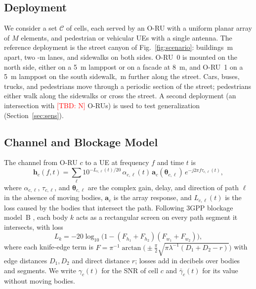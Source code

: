 \documentclass[journal]{IEEEtran}
\newcommand{\tbd}[1]{\textcolor{red}{[TBD: #1]}}
\begin{document}
\subsection{Deployment}
We consider a set $\mathcal C$ of cells, each served by an O-RU with a
uniform planar array of $M$ elements, and pedestrian or vehicular UEs
with a single antenna. The reference deployment is the street canyon of
Fig.~\ref{fig:scenario}: buildings \pStreetWidth\,m apart, two
\pLaneWidth-m lanes, and sidewalks on both sides. O-RU~0 is mounted on
the north side, either on a \SI{5}{m} lamppost or on a facade at
\SI{8}{m}, and O-RU~1 on a \SI{5}{m} lamppost on the south sidewalk,
\pOruOffset\,m further along the street. Cars, buses, trucks, and
pedestrians move through a periodic section of the street; pedestrians
either walk along the sidewalks or cross the street.
\textcolor{propcol}{A second deployment (an intersection with \tbd{N}
O-RUs) is used to test generalization (Section~\ref{sec:sens}).}

\subsection{Channel and Blockage Model}
The channel from O-RU $c$ to a UE at frequency $f$ and time $t$ is
\begin{equation}
\mathbf h_c(f,t)=\sum_{\ell} 10^{-L_{c,\ell}(t)/20}\,\alpha_{c,\ell}(t)\,
\mathbf a_c(\boldsymbol\theta_{c,\ell})\,e^{-j2\pi f\tau_{c,\ell}(t)},
\label{eq:channel}
\end{equation}
where $\alpha_{c,\ell}$, $\tau_{c,\ell}$, and $\boldsymbol\theta_{c,\ell}$
are the complex gain, delay, and direction of path $\ell$ in the absence
of moving bodies, $\mathbf a_c$ is the array response, and
$L_{c,\ell}(t)$ is the loss caused by the bodies that intersect the path.
Following 3GPP blockage model~B \cite{3gpp38901}, each body $k$ acts as a
rectangular screen on every path segment it intersects, with loss
\begin{equation}
L_k=-20\log_{10}\!\bigl(1-(F_{h_1}+F_{h_2})(F_{w_1}+F_{w_2})\bigr),
\label{eq:modelB}
\end{equation}
where each knife-edge term is
$F=\pi^{-1}\arctan\bigl(\pm\tfrac{\pi}{2}\sqrt{\pi\lambda^{-1}(D_1+D_2-r)}\bigr)$
with edge distances $D_1,D_2$ and direct distance $r$; losses add in
decibels over bodies and segments. We write $\gamma_c(t)$ for the SNR of
cell $c$ and $\bar\gamma_c(t)$ for its value without moving bodies.
\end{document}

